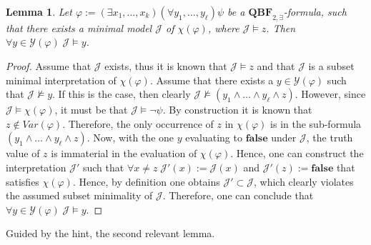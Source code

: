 \documentclass [11pt]{article}
\newcommand{\False}{\mathbf{false}}
\newcommand{\nmodels}{\not\models}
\newcommand{\var}{\mathit{Var}}
\newtheorem{lemma}[theorem]{Lemma}
\begin{document}
\begin{lemma}
\label{lem:all-y}
Let $\varphi:=(\exists x_1, \dots, x_k) (\forall y_1, \dots, y_\ell) \psi$ be a $\mathbf{QBF}_{2,\exists}$-formula, such that there exists a minimal model $\mathcal{J}$ of $\chi(\varphi)$, where $\mathcal{J} \models z$. Then $\forall y \in \mathcal{Y}(\varphi) \; \mathcal{J} \models y$.
\end{lemma}
\begin{proof}
Assume that $\mathcal{J}$ exists, thus it is known that $\mathcal{J} \models z$ and that $\mathcal{J}$ is a subset minimal interpretation of $\chi(\varphi)$. Assume that there exists a $y \in \mathcal{Y}(\varphi)$ such that $\mathcal{J} \nmodels y$. If this is the case, then clearly $\mathcal{J} \nmodels  (y_1 \wedge \dots \wedge y_\ell \wedge z)$. However, since $\mathcal{J} \models \chi(\varphi)$, it must be that $\mathcal{J}\models \neg \psi$. By construction it is known that $z \notin \var(\varphi)$. Therefore, the only occurrence of $z$ in $\chi(\varphi)$ is in the sub-formula $ (y_1 \wedge \dots \wedge y_\ell \wedge z)$. Now, with the one $y$ evaluating to $\False$ under $\mathcal{J}$, the truth value of $z$ is immaterial in the evaluation of $\chi(\varphi)$. Hence, one can construct the interpretation $\mathcal{J}'$ such that $\forall x \neq z\; \mathcal{J}'(x):=\mathcal{J}(x)$ and $\mathcal{J}'(z):=\False$ that satisfies $\chi(\varphi)$. Hence, by definition one obtains $\mathcal{J}' \subset \mathcal{J} $, which clearly violates the assumed subset minimality of $\mathcal{J}$. Therefore, one can conclude that $\forall y \in \mathcal{Y}(\varphi) \; \mathcal{J} \models y$.
\end{proof}

Guided by the hint, the second relevant lemma.
\end{document}
